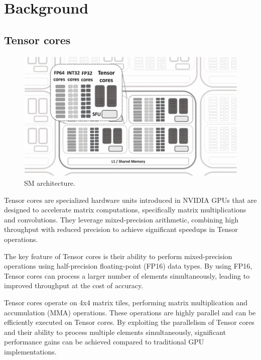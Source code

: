 \documentclass[conference]{IEEEtran}
\begin{document}
  \section{Background}\label{sec:background}
  
  \subsection{Tensor cores}\label{sec:Tensor-cores}
  \begin{figure}[htbp]
    \centering
    \includegraphics[scale=0.32]{figures/SM.png}
    \caption{SM architecture.\cite{NVIDIA_Tensor_Core_Programmability_KTH}}
    \label{fig:performance-comparison}
  \end{figure}

  Tensor cores are specialized hardware units introduced in NVIDIA GPUs that are designed to accelerate matrix computations, 
  specifically matrix multiplications and convolutions. They leverage mixed-precision arithmetic, 
  combining high throughput with reduced precision to achieve significant speedups in Tensor operations.
  
  The key feature of Tensor cores is their ability to perform mixed-precision operations using 
  half-precision floating-point (FP16) data types. By using FP16, Tensor cores can process a larger 
  number of elements simultaneously, leading to improved throughput at the cost of accuracy.\cite{precision_FMA} 
  
  Tensor cores operate on 4x4 matrix tiles, performing matrix multiplication and accumulation (MMA) 
  operations. These operations are highly parallel and can be efficiently executed on Tensor cores. 
  By exploiting the parallelism of Tensor cores and their ability to process multiple elements 
  simultaneously, significant performance gains can be achieved compared to traditional GPU 
  implementations.
\end{document}

